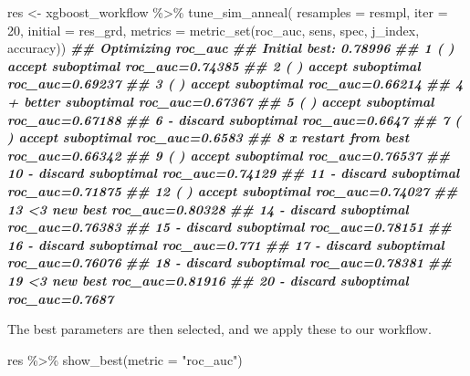 \documentclass[
]{article}
\newenvironment{Shaded}{\begin{snugshade}}{\end{snugshade}}
\newcommand{\AttributeTok}[1]{\textcolor[rgb]{0.77,0.63,0.00}{#1}}
\newcommand{\DecValTok}[1]{\textcolor[rgb]{0.00,0.00,0.81}{#1}}
\newcommand{\DocumentationTok}[1]{\textcolor[rgb]{0.56,0.35,0.01}{\textbf{\textit{#1}}}}
\newcommand{\FunctionTok}[1]{\textcolor[rgb]{0.00,0.00,0.00}{#1}}
\newcommand{\NormalTok}[1]{#1}
\newcommand{\OtherTok}[1]{\textcolor[rgb]{0.56,0.35,0.01}{#1}}
\newcommand{\SpecialCharTok}[1]{\textcolor[rgb]{0.00,0.00,0.00}{#1}}
\newcommand{\StringTok}[1]{\textcolor[rgb]{0.31,0.60,0.02}{#1}}
\begin{document}
\begin{Shaded}
\begin{Highlighting}[]
\NormalTok{res }\OtherTok{\textless{}{-}}
\NormalTok{  xgboost\_workflow }\SpecialCharTok{\%\textgreater{}\%}
  \FunctionTok{tune\_sim\_anneal}\NormalTok{(}
      \AttributeTok{resamples =}\NormalTok{ resmpl,}
      \AttributeTok{iter =} \DecValTok{20}\NormalTok{,}
      \AttributeTok{initial =}\NormalTok{ res\_grd,}
      \AttributeTok{metrics =} \FunctionTok{metric\_set}\NormalTok{(roc\_auc, sens, spec, j\_index, accuracy))}
\DocumentationTok{\#\# Optimizing roc\_auc}
\DocumentationTok{\#\# Initial best: 0.78996}
\DocumentationTok{\#\#  1 ( ) accept suboptimal  roc\_auc=0.74385}
\DocumentationTok{\#\#  2 ( ) accept suboptimal  roc\_auc=0.69237}
\DocumentationTok{\#\#  3 ( ) accept suboptimal  roc\_auc=0.66214}
\DocumentationTok{\#\#  4 + better suboptimal  roc\_auc=0.67367}
\DocumentationTok{\#\#  5 ( ) accept suboptimal  roc\_auc=0.67188}
\DocumentationTok{\#\#  6 {-} discard suboptimal roc\_auc=0.6647}
\DocumentationTok{\#\#  7 ( ) accept suboptimal  roc\_auc=0.6583}
\DocumentationTok{\#\#  8 x restart from best  roc\_auc=0.66342}
\DocumentationTok{\#\#  9 ( ) accept suboptimal  roc\_auc=0.76537}
\DocumentationTok{\#\# 10 {-} discard suboptimal roc\_auc=0.74129}
\DocumentationTok{\#\# 11 {-} discard suboptimal roc\_auc=0.71875}
\DocumentationTok{\#\# 12 ( ) accept suboptimal  roc\_auc=0.74027}
\DocumentationTok{\#\# 13 \textless{}3 new best           roc\_auc=0.80328}
\DocumentationTok{\#\# 14 {-} discard suboptimal roc\_auc=0.76383}
\DocumentationTok{\#\# 15 {-} discard suboptimal roc\_auc=0.78151}
\DocumentationTok{\#\# 16 {-} discard suboptimal roc\_auc=0.771}
\DocumentationTok{\#\# 17 {-} discard suboptimal roc\_auc=0.76076}
\DocumentationTok{\#\# 18 {-} discard suboptimal roc\_auc=0.78381}
\DocumentationTok{\#\# 19 \textless{}3 new best           roc\_auc=0.81916}
\DocumentationTok{\#\# 20 {-} discard suboptimal roc\_auc=0.7687}
\end{Highlighting}
\end{Shaded}

The best parameters are then selected, and we apply these to our
workflow.

\begin{Shaded}
\begin{Highlighting}[]
\NormalTok{res }\SpecialCharTok{\%\textgreater{}\%} \FunctionTok{show\_best}\NormalTok{(}\AttributeTok{metric =} \StringTok{"roc\_auc"}\NormalTok{)}
\end{Highlighting}
\end{Shaded}
\end{document}
